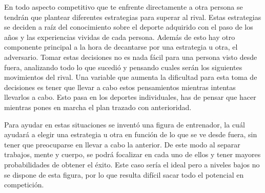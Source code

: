 \documentclass[11pt,a4paper,twoside,final]{article}
\begin{document}

\iffalse
\bigskip
\bigskip
\bigskip
En todo aspecto competitivo que te enfrente directamente a otra persona se tendrán que plantear diferentes estrategias para superar al rival. Estas estrategias se deciden a raíz del conocimiento sobre el deporte adquirido con el paso de los años y las experiencias vividas de cada persona. Además de esto hay otro componente principal a la hora de decantarse por una estrategia u otra, el adversario. Tomar estas decisiones no es nada fácil para una persona visto desde fuera, analizando todo lo que sucedió y pensando cuales serán los siguientes movimientos del rival. Una variable que aumenta la dificultad para esta toma de decisiones es tener que llevar a cabo estos pensamientos mientras intentas llevarlos a cabo. Esto pasa en los deportes individuales, has de pensar que hacer mientras pones en marcha el plan trazado con anterioridad.

\smallskip
Para ayudar en estas situaciones se inventó una figura de entrenador, la cuál ayudará a elegir una estrategia u otra en función de lo que se ve desde fuera, sin tener que preocuparse en llevar a cabo la anterior. De este modo al separar trabajos, mente y cuerpo, se podrá focalizar en cada uno de ellos y tener mayores probabilidades de obtener el éxito. Este caso sería el ideal pero a niveles bajos no se dispone de esta figura, por lo que resulta difícil sacar todo el potencial en competición.
\end{document}
